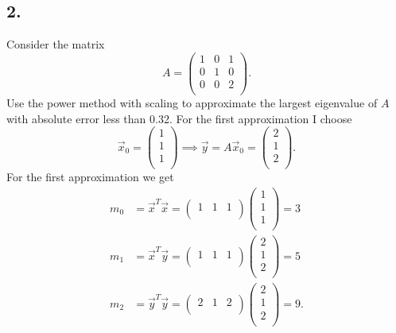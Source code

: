 \subsection*{2.} Consider the matrix
\[ 
A = \begin{pmatrix}
1 & 0 & 1\\
0 & 1 & 0\\
0 & 0 & 2\\
\end{pmatrix}
.\]
Use the power method with scaling to approximate the largest eigenvalue of $A$ with absolute error less than \num{0,32}.
\bigbreak
For the first approximation I choose 
\[ 
\Vec{x}_0 = \begin{pmatrix}
1\\
1\\
1\\
\end{pmatrix} \implies \Vec{y} = A \Vec{x}_0 = \begin{pmatrix}
2\\
1\\
2\\
\end{pmatrix}
.\]
For the first approximation we get
\begin{align*}
  m_0 &= \Vec{x}^{T} \Vec{x} = \begin{pmatrix}
  1 & 1 & 1\\
  \end{pmatrix} \begin{pmatrix}
  1\\
  1\\
  1\\
  \end{pmatrix} = 3\\
  m_1 &= \Vec{x}^{T} \Vec{y} = \begin{pmatrix}
  1 & 1 & 1\\
  \end{pmatrix} \begin{pmatrix}
  2\\
  1\\
  2\\
  \end{pmatrix} = 5 \\
  m_2 &= \Vec{y}^{T} \Vec{y} = \begin{pmatrix}
  2 & 1 & 2\\
  \end{pmatrix} \begin{pmatrix}
  2\\
  1\\
  2\\
  \end{pmatrix} = 9 
.\end{align*}
